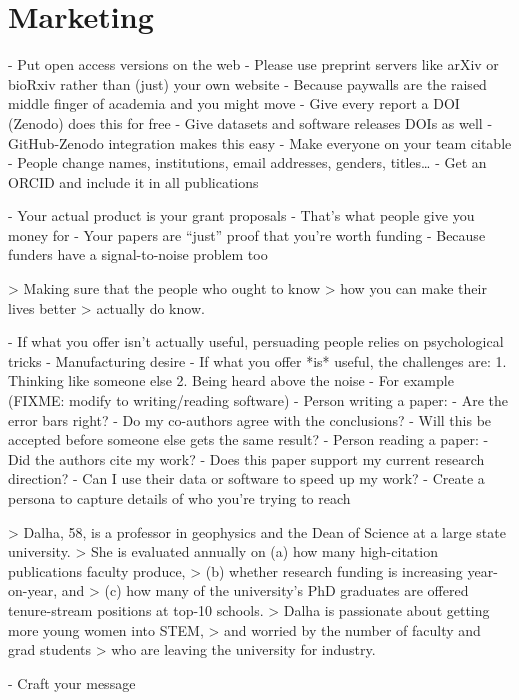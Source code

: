 \documentclass[10pt,letterpaper]{article}
\begin{document}
\section{Marketing}

- Put open access versions on the web
  - Please use preprint servers like arXiv or bioRxiv rather than (just) your own website
  - Because paywalls are the raised middle finger of academia and you might move
- Give every report a DOI (Zenodo) does this for free
- Give datasets and software releases DOIs as well
  - GitHub-Zenodo integration makes this easy
- Make everyone on your team citable
  - People change names, institutions, email addresses, genders, titles{\ldots}
  - Get an ORCID and include it in all publications

- Your actual product is your grant proposals \cite{Kuchner2011}
  - That's what people give you money for
- Your papers are ``just'' proof that you're worth funding
  - Because funders have a signal-to-noise problem too

> Making sure that the people who ought to know
> how you can make their lives better
> actually do know.

- If what you offer isn't actually useful, persuading people relies on psychological tricks
  - Manufacturing desire \cite{Berger2008,OReilly2010}
- If what you offer *is* useful, the challenges are:
  1. Thinking like someone else
  2. Being heard above the noise
- For example (FIXME: modify to writing/reading software)
  - Person writing a paper:
    - Are the error bars right?
    - Do my co-authors agree with the conclusions?
    - Will this be accepted before someone else gets the same result?
  - Person reading a paper:
    - Did the authors cite my work?
    - Does this paper support my current research direction?
    - Can I use their data or software to speed up my work?
- Create a persona to capture details of who you're trying to reach

> Dalha, 58, is a professor in geophysics and the Dean of Science at a large state university.
> She is evaluated annually on (a) how many high-citation publications faculty produce,
> (b) whether research funding is increasing year-on-year, and
> (c) how many of the university's PhD graduates are offered tenure-stream positions at top-10 schools.
> Dalha is passionate about getting more young women into STEM,
> and worried by the number of faculty and grad students
> who are leaving the university for industry.

- Craft your message
\end{document}
